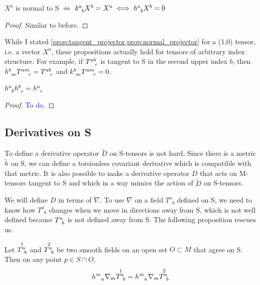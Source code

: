 \begin{proposition}\label{prop:normal_projector}
   $ X^a$ is normal to S $ \iff$ $ \tt{k}{a}{b} X^b = X^a \iff \tt{h}{a}{b} X^b =0 $ 
\end{proposition}


\begin{proof}
    Similar to before. 
\end{proof}


While I stated \cref{prop:tangent_projector,prop:normal_projector} for a (1,0) tensor, i.e. a vector $ X^a$, these propositions actually hold for tensors of arbitrary index structure. For example, if $ \tt{T}{ab}{c}$ is tangent to S in the second upper index $b$, then $ \tt{h}{b}{m} \tt{T}{am}{c}= \tt{T}{ab}{c}$ and $ \tt{k}{b}{m} \tt{T}{am}{c}=0$.

\begin{proposition}
    $ \tt{h}{a}{b} \tt{h}{b}{c} = \tt{h}{a}{c}$
\end{proposition}

\begin{proof}
    \textcolor{blue}{To do.}
\end{proof}




\subsection{Derivatives on S}

To define a derivative operator $\tilde D$ on S-tensors is not hard. Since there is a metric $ \tilde{h}$ on S, we can define a torsionless covariant derivative which is compatible with that metric. It is also possible to make a derivative operator $ D$ that acts on M-tensors tangent to S and which in a way mimics the action of $ \tilde{D}$ on S-tensors.

We will define $D$ in terms of $\nabla$. To use $\nabla$ on a field $T^a_{\phantom{a}b}$ defined on S, we need to know how $T^a_{\phantom{a}b}$ changes when we move in directions away from S, which is not well defined because $ \tt{T}{a}{b}$ is not defined away from S. The following proposition rescues us.


\begin{proposition}
    Let $\overset{1}{\tt{T}{a}{b}}$ and $\overset{2}{\tt{T}{a}{b}}$ be two smooth fields on an open set $O \subset M$ that agree on S. Then on any point $p \in S \cap O$,
\begin{align*}
    h^m_{\phantom{m}n} \nabla_m \overset{1}{\tt{T}{a}{b}} = h^m_{\phantom{m}n} \nabla_m \overset{2}{\tt{T}{a}{b}}
\end{align*}
\end{proposition}

